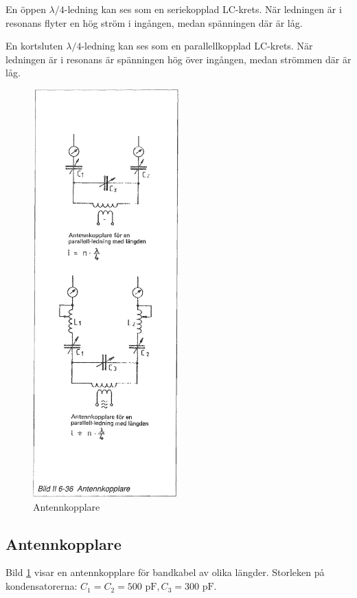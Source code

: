 En öppen \(\lambda/4\)-ledning kan ses som en seriekopplad
LC-krets. När ledningen är i resonans flyter en hög ström i ingången,
medan spänningen där är låg.

En kortsluten \(\lambda/4\)-ledning kan ses som en parallellkopplad
LC-krets. När ledningen är i resonans är spänningen hög över ingången,
medan strömmen där är låg.

\clearpage %
%
\begin{figure}
  \includegraphics[width=0.5\textwidth]{images/bild_2_6-36}
  \caption{Antennkopplare}
  \label{fig:bildII6-36}
\end{figure}
%
\subsection{Antennkopplare}
%
Bild \ref{fig:bildII6-36} visar en antennkopplare för bandkabel av olika
längder. Storleken på kondensatorerna: \(C_1 = C_2 = 500\text{ pF},
C_3 = 300\text{ pF}\).

